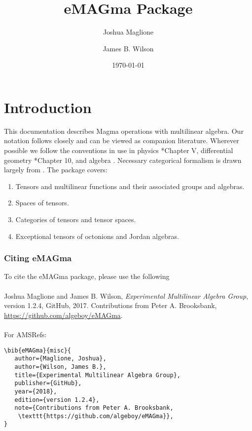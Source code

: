 \documentclass{documentation}
\title{eMAGma Package}
\author{Joshua Maglione}
\author{James B. Wilson}
\date{\today}
\begin{document}
\frontmatter

\dominitoc
\maketitle
\tableofcontents

\mainmatter

\chapter{Introduction}

This documentation describes Magma operations with multilinear algebra.
Our notation follows \cite{FMW:densors} closely and can be viewed as companion literature. 
Wherever possible we follow the conventions in use in physics \cite{Weyl}*{Chapter V}, differential geometry \cite{Lee:geom}*{Chapter 10}, and algebra \cite{Landsberg:tensors}.
Necessary categorical formalism is drawn largely from
\cite{Wilson:division}.  
The package covers:
\begin{enumerate}
\item Tensors and multilinear functions and their associated groups and algebras.
\item Spaces of tensors.
\item Categories of tensors and tensor spaces.
\item Exceptional tensors of octonions and Jordan algebras.
\end{enumerate}
\bigskip

\subsection*{Citing eMAGma} 
To cite the eMAGma package, please use the following\\
\\
Joshua Maglione and James B. Wilson, \emph{Experimental Multilinear Algebra Group}, version 1.2.4, GitHub, 2017. Contributions from Peter A. Brooksbank, \url{https://github.com/algeboy/eMAGma}. \\
\\
For AMSRefs:
\begin{verbatim}
\bib{eMAGma}{misc}{
   author={Maglione, Joshua},
   author={Wilson, James B.},
   title={Experimental Multilinear Algebra Group},
   publisher={GitHub},
   year={2018},
   edition={version 1.2.4},
   note={Contributions from Peter A. Brooksbank, 
    \texttt{https://github.com/algeboy/eMAGma}},
}
\end{verbatim}
\end{document}
